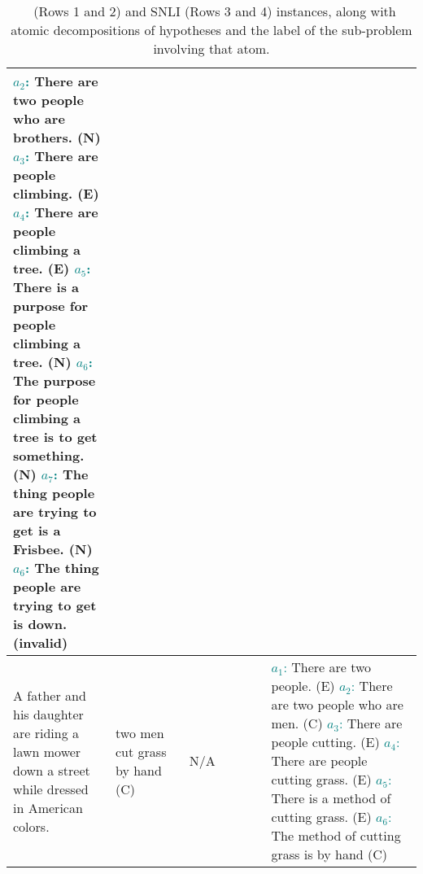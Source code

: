 \begin{table*}[ht!]
{\begin{tabular}{p{0.25\linewidth}p{0.18\linewidth}p{0.2\linewidth}p{0.65\linewidth}}
    \colorbox{lightteal}{\textcolor{teal}{\textbf{$a_2$}:}} There are two people who are brothers. (N) \newline
    \colorbox{lightteal}{\textcolor{teal}{\textbf{$a_3$}:}} There are people climbing. (E)\newline
    \colorbox{lightteal}{\textcolor{teal}{\textbf{$a_4$}:}} There are people climbing a tree. (E) \newline
    \colorbox{lightteal}{\textcolor{teal}{\textbf{$a_5$}:}} There is a purpose for people climbing a tree. (N) \newline
    \colorbox{lightteal}{\textcolor{teal}{\textbf{$a_6$}:}} The purpose for people climbing a tree is to get something. (N)\newline
    \colorbox{lightteal}{\textcolor{teal}{\textbf{$a_7$}:}} The thing people are trying to get is a Frisbee. (N)\newline
    \colorbox{lightteal}{\textcolor{teal}{\textbf{$a_6$}:}} The thing people are trying to get is down. (invalid)
    \\
    \toprule
    A father and his daughter are riding a lawn mower down a street while dressed in American colors. &
    two men cut grass by hand (C) &
    N/A &
    \colorbox{lightteal}{\textcolor{teal}{\textbf{$a_1$}:}} There are two people. (E) \newline
    \colorbox{lightteal}{\textcolor{teal}{\textbf{$a_2$}:}} There are two people who are men. (C) \newline
    \colorbox{lightteal}{\textcolor{teal}{\textbf{$a_3$}:}} There are people cutting. (E)\newline
    \colorbox{lightteal}{\textcolor{teal}{\textbf{$a_4$}:}} There are people cutting grass. (E) \newline
    \colorbox{lightteal}{\textcolor{teal}{\textbf{$a_5$}:}} There is a method of cutting grass. (E) \newline
    \colorbox{lightteal}{\textcolor{teal}{\textbf{$a_6$}:}} The method of cutting grass is by hand (C)\\
    \bottomrule
    \end{tabular}
}
\caption{\dsnli~(Rows 1 and 2) and SNLI (Rows 3 and 4) instances, along with atomic decompositions of hypotheses and the label of the sub-problem involving that atom.}
\label{table:atom-examples}
\end{table*}
